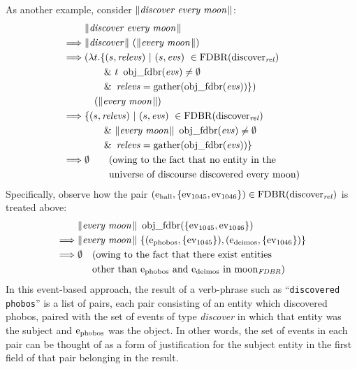 \documentclass[../main.tex]{subfiles}
\begin{document}
\begin{refsection}
As another example, consider $\lVert\textit{discover every moon\hspace{0.1em}}\rVert$:
\begin{equation*}
	\begin{split}
		& \meaningof{discover every moon} \\
		\implies & \meaningof{discover}\ (\meaningof{every moon}) \\
		\implies & (\lambda t.\{(s, \opit{relevs})\ |\ (s, \evs)\ \in \FDBR{\relation{discover}}\ \\
		& \qquad \&\ t\ \objfdbr{\evs} \neq \emptyset  \\
		& \qquad \&\ \opit{relevs} = \gatherevs{\objfdbr{\evs}}\})\ \\
		& \quad (\meaningof{every moon}) \\
		\implies & \{(s, \opit{relevs})\ |\ (s, \evs)\ \in \FDBR{\relation{discover}}\ \\
		& \qquad \&\ \meaningof{every moon}\ \objfdbr{\evs} \neq \emptyset \\
		& \qquad \&\ \opit{relevs} = \gatherevs{\objfdbr{\evs}} \} \\
		\implies & \emptyset \qquad(\dmathrm{owing to the fact that no entity in the} \\
		\phantom{\implies} & \phantom{\emptyset} \qquad \dmathrm{universe of discourse discovered every moon})
	\end{split}
\end{equation*}
Specifically, observe how the pair $(\mathrm{e}_{\operatorname{\operatorname{hall}}}, \{ \operatorname{ev}_{1045}, \operatorname{ev}_{1046} \}) \in \operatorname{FDBR}({\operatorname{discover}_{\operatorname{\mathit{rel}}}})$ is treated above:
\begin{equation*}
	\begin{split}
		&\meaningof{every moon}\ \objfdbr{\{\eventassoc{1045}, \eventassoc{1046}\}} \\
		\implies & \meaningof{every moon}\ \{(\entityassoc{phobos}, \{\eventassoc{1045}\}), (\entityassoc{deimos}, \{\eventassoc{1046}\})\} \\
		\implies & \emptyset \quad (\dmathrm{owing to the fact that there exist entities}\ \\
		\phantom{\implies}	& \phantom{\emptyset} \quad \dmathrm{other than $\entity{phobos}$ and\ $\entity{deimos}$ in\ $\wordfdbr{moon}$})
	\end{split}
\end{equation*}
In this event-based approach, the result of a verb-phrase such as ``\texttt{discovered phobos}'' is a list
of pairs, each pair consisting of an entity which discovered phobos, paired with the set of events of
type {\em discover} in which that entity was the subject and $\mathrm{e}_{\operatorname{phobos}}$ was the object.
In other words, the set of events in each pair can be thought of as a form of justification for the subject entity in the first field of that pair belonging in the result.


\end{refsection}
\end{document}
